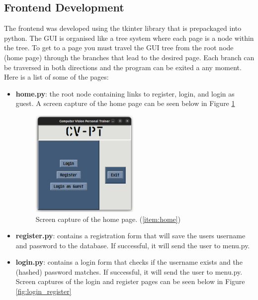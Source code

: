     \subsection{Frontend Development}
        The frontend was developed using the tkinter library that is prepackaged into python. The GUI is organised like a tree system where each page is a node within the tree. To get to a page you must travel the GUI tree from the root node (home page) through the branches that lead to the desired page. Each branch can be traversed in both directions and the program can be exited a any moment.\\
        Here is a list of some of the pages:
        \begin{itemize}
            \item \textbf{home.py}\label{item:home}: the root node containing links to register, login, and login as guest. A screen capture of the home page can be seen below in Figure \ref{fig:home}
            \begin{figure}[htbp]
                    \centering
                    \includegraphics[width=0.49\textwidth]{figures/home.png}
                    \caption{Screen capture of the home page. (\ref{item:home})}
                    \label{fig:home}
            \end{figure}
            \item \textbf{register.py}\label{item:register}: contains a registration form that will save the users username and password to the database. If successful, it will send the user to menu.py.
            \item \textbf{login.py}\label{item:login}: contains a login form that checks if the username exists and the (hashed) password matches. If successful, it will send the user to menu.py. Screen captures of the login and register pages can be seen below in Figure \ref{fig:login_register}
            \begin{figure}[htbp]

\end{figure}
\end{itemize}
